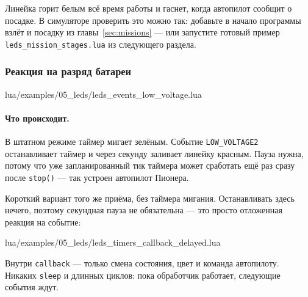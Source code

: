 Линейка горит белым всё время работы и гаснет, когда автопилот сообщит о посадке. В симуляторе проверить это можно так: добавьте в начало программы взлёт и посадку из главы~\ref{sec:missions} --- или запустите готовый пример \texttt{leds\_mission\_stages.lua} из следующего раздела.

\subsubsection*{Реакция на разряд батареи}

\begin{codefile}{lua/examples/05_leds/leds_events_low_voltage.lua}
\end{codefile}

\paragraph{Что происходит.} В штатном режиме таймер мигает зелёным. Событие \verb|LOW_VOLTAGE2| останавливает таймер и через секунду заливает линейку красным. Пауза нужна, потому что уже запланированный тик таймера может сработать ещё раз сразу после \verb|stop()| --- так устроен автопилот Пионера.

Короткий вариант того же приёма, без таймера мигания. Останавливать здесь нечего, поэтому секундная пауза не обязательна --- это просто отложенная реакция на событие:

\begin{codefile}{lua/examples/05_leds/leds_timers_callback_delayed.lua}
\end{codefile}

\begin{rulebox}
Внутри \verb|callback| --- только смена состояния, цвет и команда автопилоту. Никаких \verb|sleep| и длинных циклов: пока обработчик работает, следующие события ждут.
\end{rulebox}
